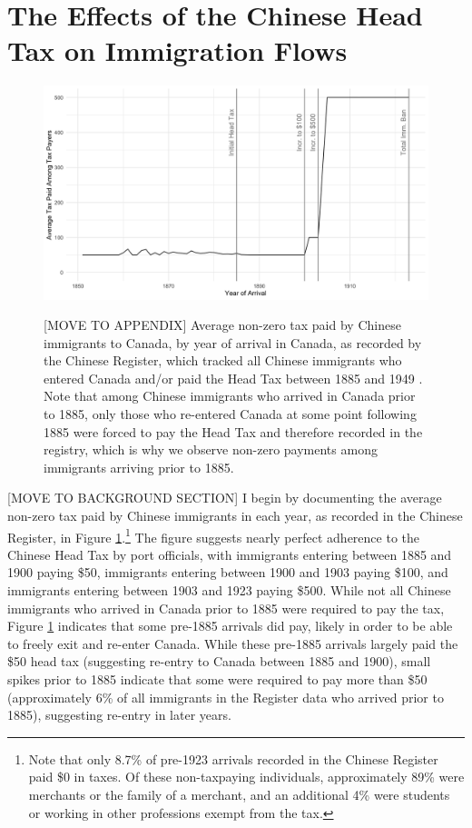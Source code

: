 \documentclass[12pt]{article}
\begin{document}
\section{The Effects of the Chinese Head Tax on Immigration Flows}

\begin{figure}
    \centering 
    \caption{[MOVE TO APPENDIX] Average non-zero tax paid by Chinese immigrants to Canada, by year of arrival in Canada, as recorded by the Chinese Register, which tracked all Chinese immigrants who entered Canada and/or paid the Head Tax between 1885 and 1949 \citep{chineseregister}. Note that among Chinese immigrants who arrived in Canada prior to 1885, only those who re-entered Canada at some point following 1885 were forced to pay the Head Tax and therefore recorded in the registry, which is why we observe non-zero payments among immigrants arriving prior to 1885.}
    \includegraphics[width=\textwidth]{../../figs/fig1_taxespaid.png}
    \label{fig:taxpaid}
\end{figure}

[MOVE TO BACKGROUND SECTION] I begin by documenting the average non-zero tax paid by Chinese immigrants in each year, as recorded in the Chinese Register, in Figure \ref{fig:taxpaid}.\footnote{Note that only 8.7\% of pre-1923 arrivals recorded in the Chinese Register paid \$0 in taxes. 
Of these non-taxpaying individuals, approximately 89\% were merchants or the family of a merchant, and an additional 4\% were students or working in other professions exempt from the tax.} The figure suggests nearly perfect adherence to the Chinese Head Tax by port officials, with immigrants entering between 1885 and 1900 paying \$50, immigrants entering between 1900 and 1903 paying \$100, and immigrants entering between 1903 and 1923 paying \$500. 
While not all Chinese immigrants who arrived in Canada prior to 1885 were required to pay the tax, Figure \ref{fig:taxpaid} indicates that some pre-1885 arrivals did pay, likely in order to be able to freely exit and re-enter Canada. While these pre-1885 arrivals largely paid the \$50 head tax (suggesting re-entry to Canada between 1885 and 1900), small spikes prior to 1885 indicate that some were required to pay more than \$50 (approximately 6\% of all immigrants in the Register data who arrived prior to 1885), suggesting re-entry in later years. 
\end{document}
